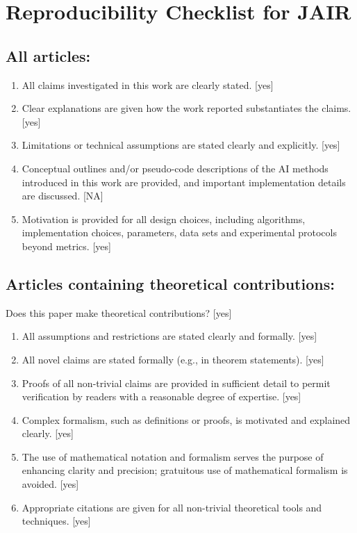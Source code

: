 \documentclass[manuscript,screen,review]{jair}
\begin{document}
\section{Reproducibility Checklist for JAIR}
\footnotesize
\setlength{\parskip}{2pt}

\subsection*{All articles:}
\begin{enumerate}\setlength{\itemsep}{0pt}\setlength{\parsep}{0pt}\setlength{\topsep}{2pt}
    \item All claims investigated in this work are clearly stated. [yes]
    \item Clear explanations are given how the work reported substantiates the claims. [yes]
    \item Limitations or technical assumptions are stated clearly and explicitly. [yes]
    \item Conceptual outlines and/or pseudo-code descriptions of the AI methods introduced in this work are provided, and important implementation details are discussed. [NA]
    \item Motivation is provided for all design choices, including algorithms, implementation choices, parameters, data sets and experimental protocols beyond metrics. [yes]
\end{enumerate}

\subsection*{Articles containing theoretical contributions:}
Does this paper make theoretical contributions? [yes]
\begin{enumerate}\setlength{\itemsep}{0pt}\setlength{\parsep}{0pt}\setlength{\topsep}{2pt}
    \item All assumptions and restrictions are stated clearly and formally. [yes]
    \item All novel claims are stated formally (e.g., in theorem statements). [yes]
    \item Proofs of all non-trivial claims are provided in sufficient detail to permit verification by readers with a reasonable degree of expertise. [yes]
    \item Complex formalism, such as definitions or proofs, is motivated and explained clearly. [yes]
    \item The use of mathematical notation and formalism serves the purpose of enhancing clarity and precision; gratuitous use of mathematical formalism is avoided. [yes]
    \item Appropriate citations are given for all non-trivial theoretical tools and techniques. [yes]
\end{enumerate}
\end{document}

